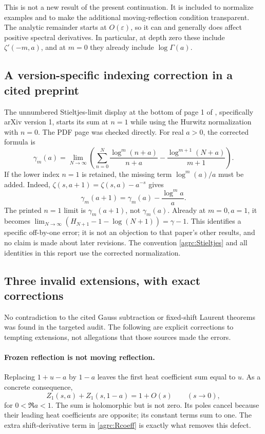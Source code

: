 \documentclass[11pt]{article}
\numberwithin{equation}{section}
\theoremstyle{definition}\newtheorem{definition}[theorem]{Definition}
\theoremstyle{remark}\newtheorem{remark}[theorem]{Remark}
\begin{document}
This is not a new result of the present continuation. It is included
to normalize examples and to make the additional moving-reflection
condition transparent. The analytic remainder starts at
$O(\varepsilon)$, so it can and generally does affect positive spectral
 derivatives. In particular, at depth zero these include
$\zeta'(-m,a)$, and at $m=0$ they already include $\log\Gamma(a)$.

\subsection{A version-specific indexing correction in a cited preprint}

The unnumbered Stieltjes-limit display at the bottom of page 1 of
\cite{Can2024}, specifically arXiv version 1, starts its sum at $n=1$
while using the Hurwitz normalization with $n=0$. The PDF page was
checked directly. For real $a>0$, the corrected formula is
\begin{equation}\label{agrc:corrected-Stieltjes-limit}
 \gamma_m(a)=\lim_{N\to\infty}\left(
 \sum_{n=0}^{N}\frac{\log^m(n+a)}{n+a}
                  -\frac{\log^{m+1}(N+a)}{m+1}\right).
\end{equation}
If the lower index $n=1$ is retained, the missing term
$\log^m(a)/a$ must be added. Indeed,
$\zeta(s,a+1)=\zeta(s,a)-a^{-s}$ gives
\[
 \gamma_m(a+1)=\gamma_m(a)-\frac{\log^m a}{a}.
\]
The printed $n=1$ limit is $\gamma_m(a+1)$, not $\gamma_m(a)$.
Already at $m=0,a=1$, it becomes
$\lim_{N\to\infty}(H_{N+1}-1-\log(N+1))=\gamma-1$.
This identifies a specific off-by-one error; it is not an objection to
that paper's other results, and no claim is made about later revisions.
The convention \eqref{agrc:Stieltjes} and all identities in this report
use the corrected normalization.

\subsection{Three invalid extensions, with exact corrections}

No contradiction to the cited Gauss subtraction or fixed-shift Laurent
theorems was found in the targeted audit. The following are explicit
corrections to tempting extensions, not allegations that those sources
made the errors.

\paragraph{Frozen reflection is not moving reflection.}
Replacing $1+u-a$ by $1-a$ leaves the first heat coefficient sum equal
to $u$. As a concrete consequence,
\begin{equation}\label{agrc:frozen-counterexample}
 Z_1(s,a)+Z_1(s,1-a)=1+O(s)\qquad(s\to0),
\end{equation}
for $0<\Re a<1$. The sum is holomorphic but is not zero. Its poles
cancel because their leading heat coefficients are opposite; its
constant terms sum to one. The extra shift-derivative term in
\eqref{agrc:Rcoeff} is exactly what removes this defect.
\end{document}
